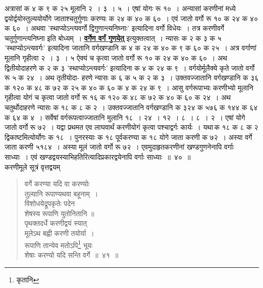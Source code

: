 \documentclass[11pt, openany]{book}
\begin{document}
{{\vspace{-3mm}
\noindent अत्रासां क ४ क ९ क २५ मूलानि २~। ३~। ५~। एषां योगः रू १०~। अन्यासां करणीनां मध्ये द्वयोर्द्वयोस्तुल्ययोर्योगे जाताश्चतुर्गुणाः
करण्यः क २४ क ४० क ६०~। एवं जातो वर्गो रू १० क २४ क ४० क ६०~। अथवा 
{\qt 'स्थाप्योऽन्त्यवर्गो द्विगुणान्त्यनिघ्नाः'} इत्यादिना वर्गो विधेयः~। तत्र करणीवर्गे चतुर्गुणान्त्यनिघ्ना इति बोध्यम्~। \hyperref[34]{\textbf{वर्गेण वर्गं गुणयेत्}} इत्युक्तत्वात्~।
न्यासः क २ क ३ क ५ {\qt 'स्थाप्योऽन्त्यवर्गः'} इत्यादिना जातानि वर्गखण्डानि क ४ 
क २४ क ४० क ९ क ६० क २५~। अत्र वर्गाणां मूलानि गृहीत्वा 
२~। ३~। ५ ऐक्यं च कृत्वा जातो वर्गो रू १० क २४ क ४० क ६०~। 
अथ द्वितीयोदाहरणे क २ क ३ {\qt 'स्थाप्योऽन्त्यवर्गः'} इत्यादिना क ४ क 
२४ क ९~। वर्गयोर्मूलैक्ये कृते जातो वर्गो रू ५ क २४~। अथ तृतीयोदा-
\newpage
\noindent हरणे न्यासः क ६ क ५ क २ क ३~। उक्तवज्जातानि वर्गखण्डानि क 
३६ क १२० क ४८ क ७२ क २५ क ४० क ६० क ४ क २४ 
क ९~। आसु वर्गरूपाभ्यः करणीभ्यो मूलानि गृहीत्वा योगं च कृत्वा जातो 
वर्गो रू १६ क १२० क ४८ क ७२ क ४० क ६० क २४~। अथ 
चतुर्थोदाहरणे न्यासः क १८ क ८ क २~। उक्तवज्जातानि वर्गखण्डानि क 
३२४ क ५७६ क १४४ क ६४ क ६४ क ४~। सर्वेषां वर्गरूपत्वाज्जातानि 
मुलानि १८~। २४~। १२~। ८~। ८~। २~। एषां योगे जातो वर्गो रू 
७२~। यद्वा प्रथमत एव लाघवार्थं करणीयोगं कृत्वा पश्चाद्वर्गः कार्यः~।
यथा\textendash \,क १८ क ८ क २ द्विकाष्टमित्योर्योगः क १८~। पुनरस्याः क १८ पूर्वकरण्या 
क १८ योगे जाता करणी क ७२~। अस्या वर्गे जाता करणी ५१८४~। 
अस्या मूलं जातो वर्गो रू ७२~। एवमुदाहृतकरणीनां खण्डगुणनेनापि वर्गाः 
साध्याः~। एवं खण्डद्वयस्याभिहतिरित्यादिप्रकारद्वयेनापि वर्गाः साध्याः~॥~४०~॥\\

\vspace{-2mm}
{\bqt करणीमूले सूत्रं वृत्तद्वयम्\textendash \,}
 \label{41}
\begin{quote}
    {\ab 
    वर्गे करण्या यदि वा करण्योः \\
    तुल्यानि रूपाण्यथवा बहूनाम्~। \\
विशोधयेद्रूपकृतेः पदेन \\
शेषस्य रूपाणि युतोनितानि ॥\\
पृथक्तदर्धे करणीद्वयं स्यात् \\
मूलेऽथ बह्वी करणी तयोर्या~। \\
रूपाणि तान्येव मतोऽपि\footnote{कृतानि} भूयः \\
शेषाः करण्यो यदि सन्ति वर्गे~॥~४१~॥}
\end{quote}

}}
\end{document}

